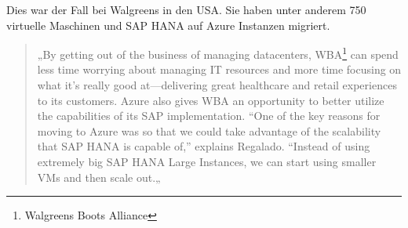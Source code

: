 
Dies war der Fall bei Walgreens in den USA.
Sie haben unter anderem 750 virtuelle Maschinen und SAP HANA auf Azure Instanzen migriert.

\begin{quote}
      „By getting out of the business of managing datacenters, WBA\footnote{Walgreens Boots Alliance} can spend less time worrying about managing IT resources and more time focusing on what it’s really good at—delivering great healthcare and retail experiences to its customers. Azure also gives WBA an opportunity to better utilize the capabilities of its SAP implementation. “One of the key reasons for moving to Azure was so that we could take advantage of the scalability that SAP HANA is capable of,” explains Regalado. “Instead of using extremely big SAP HANA Large Instances, we can start using smaller VMs and then scale out.„
          
            {\cite{AZU01}}
\end{quote}

